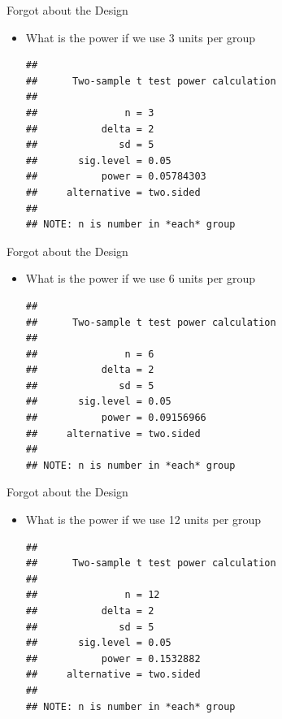 \documentclass[xcolor=x11names,compress]{beamer}\usepackage[]{graphicx}\usepackage[]{color}
\makeatletter
\newenvironment{kframe}{%
 \def\at@end@of@kframe{}%
 \ifinner\ifhmode%
  \def\at@end@of@kframe{\end{minipage}}%
  \begin{minipage}{\columnwidth}%
 \fi\fi%
 \def\FrameCommand##1{\hskip\@totalleftmargin \hskip-\fboxsep
 \colorbox{shadecolor}{##1}\hskip-\fboxsep
     \hskip-\linewidth \hskip-\@totalleftmargin \hskip\columnwidth}%
 \MakeFramed {\advance\hsize-\width
   \@totalleftmargin\z@ \linewidth\hsize
   \@setminipage}}%
 {\par\unskip\endMakeFramed%
 \at@end@of@kframe}
\newenvironment{knitrout}{}{} %
\makeatother
\begin{document}
\begin{frame}[fragile]{Forgot about the Design}

  \begin{itemize}
  \item What is the power if we use 3 units per group
\begin{knitrout}\tiny
{}\color{fgcolor}\begin{kframe}
\begin{verbatim}
## 
##      Two-sample t test power calculation 
## 
##               n = 3
##           delta = 2
##              sd = 5
##       sig.level = 0.05
##           power = 0.05784303
##     alternative = two.sided
## 
## NOTE: n is number in *each* group
\end{verbatim}
\end{kframe}
\end{knitrout}
  \end{itemize}
  
\end{frame}

\begin{frame}[fragile]{Forgot about the Design}

  \begin{itemize}
  \item What is the power if we use 6 units per group
\begin{knitrout}\tiny
{}\color{fgcolor}\begin{kframe}
\begin{verbatim}
## 
##      Two-sample t test power calculation 
## 
##               n = 6
##           delta = 2
##              sd = 5
##       sig.level = 0.05
##           power = 0.09156966
##     alternative = two.sided
## 
## NOTE: n is number in *each* group
\end{verbatim}
\end{kframe}
\end{knitrout}
  \end{itemize}
  
\end{frame}


\begin{frame}[fragile]{Forgot about the Design}

  \begin{itemize}
  \item What is the power if we use 12 units per group
\begin{knitrout}\tiny
{}\color{fgcolor}\begin{kframe}
\begin{verbatim}
## 
##      Two-sample t test power calculation 
## 
##               n = 12
##           delta = 2
##              sd = 5
##       sig.level = 0.05
##           power = 0.1532882
##     alternative = two.sided
## 
## NOTE: n is number in *each* group
\end{verbatim}
\end{kframe}
\end{knitrout}
  \end{itemize}
  
\end{frame}
\end{document}
